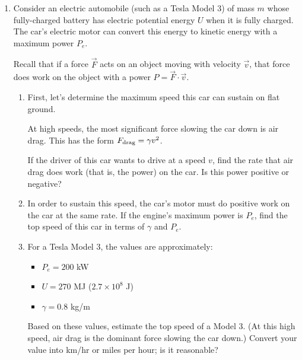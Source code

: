 \documentclass[12pt]{article}
\begin{document}
\Large
\centerline{}
\normalsize


\begin{enumerate}
	
\item Consider an electric automobile (such as a Tesla Model 3) of mass $m$ whose fully-charged battery has electric potential energy $U$ when it is fully charged. The car's electric motor can convert this energy to kinetic energy with a maximum power $P_e$.

Recall that if a force $\vec F$ acts on an object moving with velocity $\vec v$, that force does work on the object with a power $P = \vec F \cdot \vec v$.

\begin{enumerate}
	\item First, let's determine the maximum speed this car can sustain on flat ground.
	
	At high speeds, the most significant force slowing the car down is air drag. This has the form $F_{\rm drag} = \gamma v^2$.
	
		If the driver of this car wants to drive at a speed $v$, find the rate that air drag does work (that is, the power) on the car. Is this power positive or negative?
	
	\vspace{2in}
	
	\item In order to sustain this speed, the car's motor must do positive work on the car at the same rate. If the engine's maximum power is $P_e$, find the top speed of this car in terms of $\gamma$ and $P_e$.
	
	\newpage
	
	\item For a Tesla Model 3, the values are approximately:
	
	\begin{itemize}
	\item $P_e = 200$ kW
	\item $U = 270$ MJ ($2.7 \times 10^8$ J)
	\item $\gamma = 0.8$ kg/m
	\end{itemize}
	
	Based on these values, estimate the top speed of a Model 3. (At this high speed, air drag is the dominant force slowing the car down.) Convert your value into km/hr or miles per hour; is it reasonable?
	

\end{enumerate}
\end{enumerate}
\end{document}
